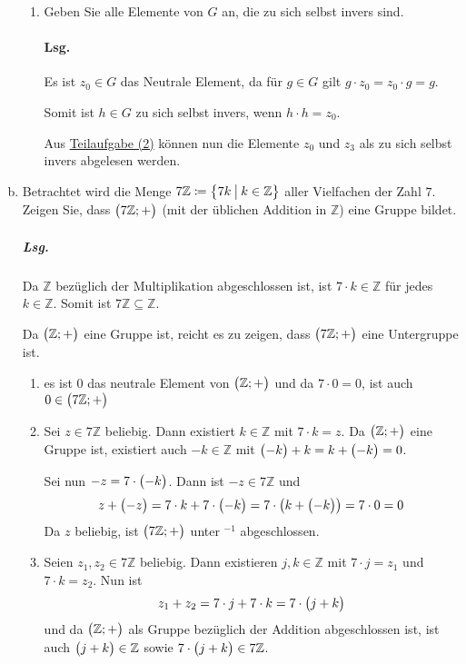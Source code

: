 \documentclass{scrreprt}
\begin{document}
\begin{enumerate}[(a)]
\begin{enumerate}[(1)]
  \item Geben Sie alle Elemente von $G$ an, die zu sich selbst invers sind.

    \paragraph{Lsg.} Es ist $z_0 \in G$ das Neutrale Element, da für $g \in G$
    gilt $g \cdot z_0 = z_0 \cdot g = g$.

    Somit ist $h \in G$ zu sich selbst invers, wenn $h \cdot h = z_0$.

    Aus \hyperref[n6_a_2]{Teilaufgabe (2)} können nun die Elemente $z_0$ und
    $z_3$ als zu sich selbst invers abgelesen werden.

  \end{enumerate}

\newpage
\item Betrachtet wird die Menge
  $7\mathbb{Z} \coloneqq \qty\big{7k \:\big|\: k \in \mathbb{Z}}$ aller
  Vielfachen der Zahl $7$.
  Zeigen Sie, dass $\qty\big(7\mathbb{Z};+)$ (mit der üblichen Addition in
  $\mathbb{Z}$) eine Gruppe bildet.

  \subparagraph{Lsg.} Da $\mathbb{Z}$ bezüglich der Multiplikation abgeschlossen
  ist, ist $7 \cdot k \in \mathbb{Z}$ für jedes $k \in \mathbb{Z}$.
  Somit ist $7\mathbb{Z} \subseteq \mathbb{Z}$.

  Da $\qty\big(\mathbb{Z}; +)$ eine Gruppe ist, reicht es zu zeigen, dass
  $\qty\big(7\mathbb{Z};+)$ eine Untergruppe ist.

  \begin{enumerate}[(1)]
  \item es ist $0$ das neutrale Element von $\qty\big(\mathbb{Z}; +)$ und
    da $7 \cdot 0 = 0$, ist auch $0 \in \qty\big(7\mathbb{Z};+)$

  \item Sei $z \in 7\mathbb{Z}$ beliebig.
    Dann existiert $k \in \mathbb{Z}$ mit $7 \cdot k = z$.
    Da $\qty\big(\mathbb{Z}; +)$ eine Gruppe ist, existiert auch
    $-k \in \mathbb{Z}$ mit $\qty\big(-k) + k = k + \qty\big(-k) = 0$.

    Sei nun $-z = 7 \cdot \qty\big(-k)$.
    Dann ist $-z \in 7\mathbb{Z}$ und
    \[
      z + \qty\big(-z)
      = 7 \cdot k + 7 \cdot \qty\big(-k)
      = 7 \cdot \qty\big(k + \qty\big(-k))
      = 7 \cdot 0
      = 0
    \]
    Da $z$ beliebig, ist $\qty\big(7\mathbb{Z};+)$ unter $^{-1}$ abgeschlossen.

  \item Seien $z_1, z_2 \in 7\mathbb{Z}$ beliebig.
    Dann existieren $j, k \in \mathbb{Z}$ mit $7 \cdot j = z_1$ und
    $7 \cdot k = z_2$.
    Nun ist
    \[
      z_1 + z_2 = 7 \cdot j + 7 \cdot k
      = 7 \cdot \qty\big(j + k)
    \]
    und da $\qty\big(\mathbb{Z}; +)$ als Gruppe bezüglich der Addition
    abgeschlossen ist, ist auch $\qty\big(j + k) \in \mathbb{Z}$ sowie
    $7 \cdot \qty\big(j + k) \in 7\mathbb{Z}$.


\end{enumerate}
\end{enumerate}
\end{document}
